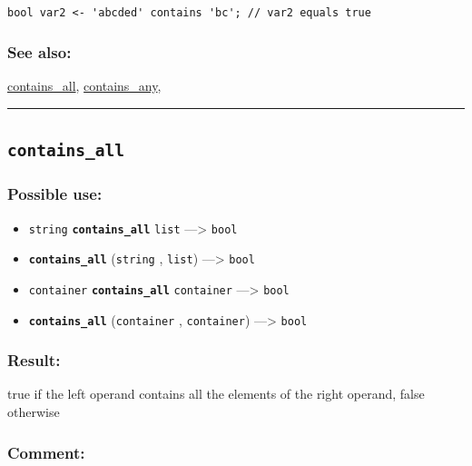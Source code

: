 \documentclass[]{book}
\providecommand{\tightlist}{%
  \setlength{\itemsep}{0pt}\setlength{\parskip}{0pt}}
\theoremstyle{definition}
\theoremstyle{definition}
\theoremstyle{definition}
\theoremstyle{remark}
\begin{document}
\begin{verbatim}
 
bool var2 <- 'abcded' contains 'bc'; // var2 equals true
\end{verbatim}

\subsubsection{See also:}\label{see-also-62}

\href{operators-b-to-c.html\#contains_all}{contains\_all},
\href{operators-b-to-c.html\#contains_any}{contains\_any},

\begin{center}\rule{0.5\linewidth}{\linethickness}\end{center}

\subsection{\texorpdfstring{\texttt{contains\_all}}{contains\_all}}\label{contains_all}

\subsubsection{Possible use:}\label{possible-use-100}

\begin{itemize}
\tightlist
\item
  \texttt{string} \textbf{\texttt{contains\_all}} \texttt{list}
  ---\textgreater{} \texttt{bool}
\item
  \textbf{\texttt{contains\_all}} (\texttt{string} , \texttt{list})
  ---\textgreater{} \texttt{bool}
\item
  \texttt{container} \textbf{\texttt{contains\_all}} \texttt{container}
  ---\textgreater{} \texttt{bool}
\item
  \textbf{\texttt{contains\_all}} (\texttt{container} ,
  \texttt{container}) ---\textgreater{} \texttt{bool}
\end{itemize}

\subsubsection{Result:}\label{result-98}

true if the left operand contains all the elements of the right operand,
false otherwise

\subsubsection{Comment:}\label{comment-25}
\end{document}
